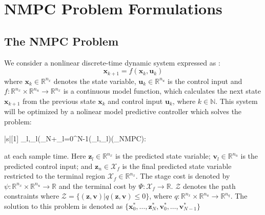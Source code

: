 \section{NMPC Problem Formulations}
\subsection{The NMPC Problem}
We consider a nonlinear discrete-time dynamic system expressed as \cite{economic}:
\begin{equation}
	\boldsymbol{x}_{k+1}=f(\boldsymbol{x}_k,\boldsymbol{u}_k)
	\label{eq:nonlin}
\end{equation}
where $\boldsymbol{x}_k\in\mathbb{R}^{n_x}$ denotes the state variable, $\boldsymbol{u}_k\in\mathbb{R}^{n_u}$ is the control input and $f:\mathbb{R}^{n_x}\times\mathbb{R}^{n_u}\rightarrow \mathbb{R}^{n_x}$ is a continuous model function, which calculates the next state $\boldsymbol{x}_{k+1}$ from the previous state $\boldsymbol{x}_k$ and control input $\boldsymbol{u}_k$, where $k\in\mathbb{N}$.
This system will be optimized by a nolinear model predictive controller which solves the problem:
\begin{mini!}|s|[1]
	{_l,_l}{\Psi(_N+\sum_{l=0}^{N-1}\psi(_l,_l)}{}{(_{NMPC}):}
\end{mini!}
at each sample time.
Here $\boldsymbol{z}_l\in\mathbb{R}^{n_x}$ is the predicted state variable; $\boldsymbol{v}_l\in\mathbb{R}^{n_u}$ is the predicted control input; and $\boldsymbol{z}_n\in\mathcal{X}_f$ is the final predicted state variable restricted to the terminal region $\mathcal{X}_f\in\mathbb{R}^{n_x}$.
The stage cost is denoted by $\psi:\mathbb{R}^{n_x}\times\mathbb{R}^{n_u}\rightarrow\mathbb{R}$ and the terminal cost by $\Psi:\mathcal{X}_f\rightarrow\mathbb{R}$.
$\mathcal{Z}$ denotes the path constraints where $\mathcal{Z}=\{(\boldsymbol{z},\boldsymbol{v})|q(\boldsymbol{z},\boldsymbol{v})\leq 0\}$, where $q:\mathbb{R}^{n_x}\times\mathbb{R}^{n_u}\rightarrow\mathbb{R}^{n_q}$.
The solution to this problem is denoted as $\{\boldsymbol{x}_0^*,\ldots,\boldsymbol{z}_N^*,\boldsymbol{v}_0^*,\ldots,\boldsymbol{v}_{N-1}^*\}$
